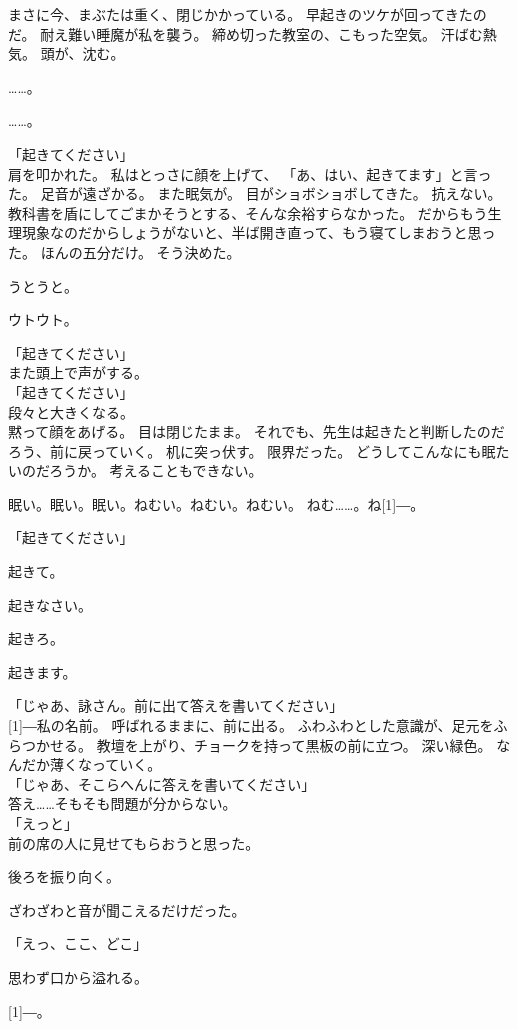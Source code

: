 \documentclass[../IHMain]{subfiles}
\begin{document}
まさに今、まぶたは重く、閉じかかっている。
早起きのツケが回ってきたのだ。
耐え難い睡魔が私を襲う。
締め切った教室の、こもった空気。
汗ばむ熱気。
頭が、沈む。

……。

……。

「起きてください」\\
肩を叩かれた。
私はとっさに顔を上げて、
「あ、はい、起きてます」と言った。
足音が遠ざかる。
また眠気が。
目がショボショボしてきた。
抗えない。
教科書を盾にしてごまかそうとする、そんな余裕すらなかった。
だからもう生理現象なのだからしょうがないと、半ば開き直って、もう寝てしまおうと思った。
ほんの五分だけ。
そう決めた。

うとうと。

ウトウト。

「起きてください」\\
また頭上で声がする。\\
「起きてください」\\
段々と大きくなる。\\
黙って顔をあげる。
目は閉じたまま。
それでも、先生は起きたと判断したのだろう、前に戻っていく。
机に突っ伏す。
限界だった。
どうしてこんなにも眠たいのだろうか。
考えることもできない。

眠い。眠い。眠い。ねむい。ねむい。ねむい。
ねむ……。ね\scalebox{3}[1]{―}。

「起きてください」

起きて。

起きなさい。

起きろ。

起きます。

「じゃあ、詠さん。前に出て答えを書いてください」\\
\scalebox{3}[1]{―}私の名前。
呼ばれるままに、前に出る。
ふわふわとした意識が、足元をふらつかせる。
教壇を上がり、チョークを持って黒板の前に立つ。
深い緑色。
なんだか薄くなっていく。\\
「じゃあ、そこらへんに答えを書いてください」\\
答え……そもそも問題が分からない。\\
「えっと」\\
前の席の人に見せてもらおうと思った。

後ろを振り向く。

ざわざわと音が聞こえるだけだった。

「えっ、ここ、どこ」

思わず口から溢れる。

\scalebox{3}[1]{―}。
\end{document}
